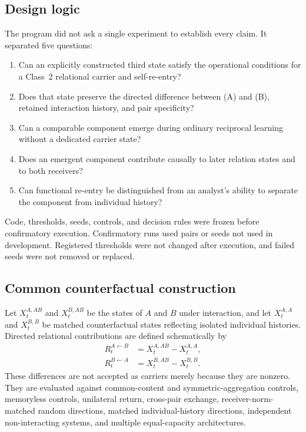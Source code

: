 \documentclass[11pt,a4paper]{article}
\begin{document}
\subsection{Design logic}

The program did not ask a single experiment to establish every claim. It separated five questions:
\begin{enumerate}
  \item Can an explicitly constructed third state satisfy the operational conditions for a Class~2 relational carrier and self-re-entry?
  \item Does that state preserve the directed difference between (A) and (B), retained interaction history, and pair specificity?
  \item Can a comparable component emerge during ordinary reciprocal learning without a dedicated carrier state?
  \item Does an emergent component contribute causally to later relation states and to both receivers?
  \item Can functional re-entry be distinguished from an analyst's ability to separate the component from individual history?
\end{enumerate}

Code, thresholds, seeds, controls, and decision rules were frozen before confirmatory execution. Confirmatory runs used pairs or seeds not used in development. Registered thresholds were not changed after execution, and failed seeds were not removed or replaced.

\subsection{Common counterfactual construction}

Let $X^{A,AB}_t$ and $X^{B,AB}_t$ be the states of $A$ and $B$ under interaction, and let $X^{A,A}_t$ and $X^{B,B}_t$ be matched counterfactual states reflecting isolated individual histories. Directed relational contributions are defined schematically by
\begin{align}
 R^{A\leftarrow B}_t &= X^{A,AB}_t-X^{A,A}_t,\\
 R^{B\leftarrow A}_t &= X^{B,AB}_t-X^{B,B}_t.
 \label{eq:directed}
\end{align}
These differences are not accepted as carriers merely because they are nonzero. They are evaluated against common-content and symmetric-aggregation controls, memoryless controls, unilateral return, cross-pair exchange, receiver-norm-matched random directions, matched individual-history directions, independent non-interacting systems, and multiple equal-capacity architectures.
\end{document}
